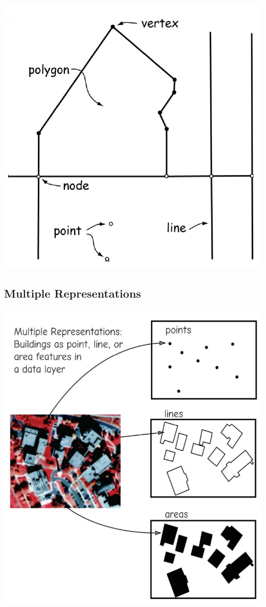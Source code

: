 \documentclass[11pt]{article}
\theoremstyle{definition}
\begin{document}
\includegraphics[width=\textwidth/2]{20.png}

\subsection{Multiple Representations}
\includegraphics[width=\textwidth/2]{21.png}
\end{document}
